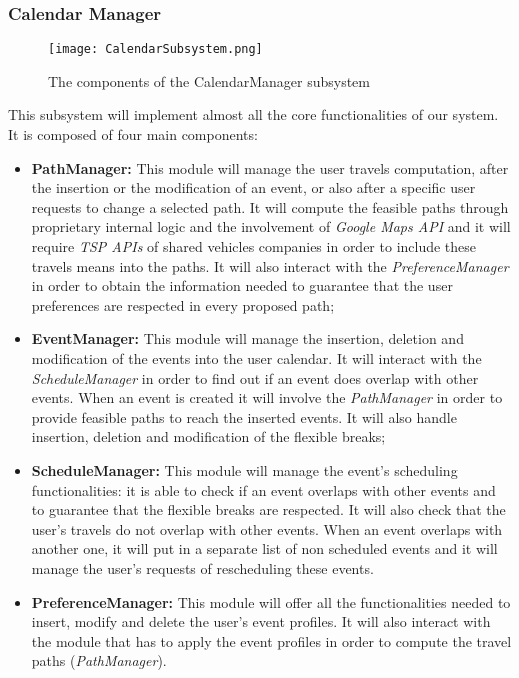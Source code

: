 \subsubsection{Calendar Manager}
\label{subsubsect:Calendar Manager}
\begin{figure}[H]
	\begin{center}
		\hspace*{-60pt}
		\texttt{[image: CalendarSubsystem.png]}
	\end{center}
	\caption{The components of the CalendarManager subsystem}
\end{figure}
	This subsystem will implement almost all the core functionalities of our system.\\ It is composed of four main components:
	\begin{itemize}
		\item \textbf{PathManager:} This module will manage the user travels computation, after the insertion or the modification of an event, or also after a specific user requests to change a selected path. It will compute the feasible paths through proprietary internal logic and the involvement of \textit{Google Maps API} and it will require \textit{TSP APIs} of shared vehicles companies in order to include these travels means into the paths. It will also interact with the \textit{PreferenceManager} in order to obtain the information needed to guarantee that the user preferences are respected in every proposed path;
		\item \textbf{EventManager:} This module will manage the insertion, deletion and modification of the events into the user calendar. It will interact with the \textit{ScheduleManager} in order to find out if an event does overlap with other events. When an event is created it will involve the \textit{PathManager} in order to provide feasible paths to reach the inserted events. It will also handle insertion, deletion and modification of the flexible breaks;
		\item \textbf{ScheduleManager:} This module will manage the event's scheduling functionalities: it is able to check if an event overlaps with other events and to guarantee that the flexible breaks are respected. It will also check that the user's travels do not overlap with other events. When an event overlaps with another one, it will put in a separate list of non scheduled events and it will manage the user's requests of rescheduling these events.
		\item \textbf{PreferenceManager:} This module will offer all the functionalities needed to insert, modify and delete the user's event profiles. It will also interact with the module that has to apply the event profiles in order to compute the travel paths (\textit{PathManager}).
	\end{itemize}
	
